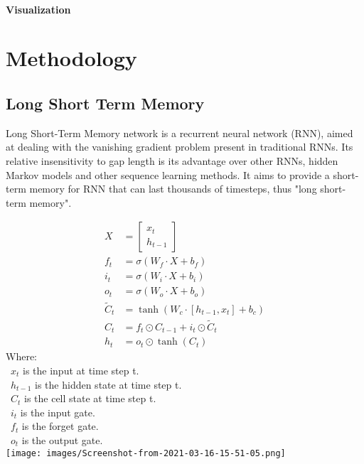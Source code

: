 \documentclass{ieeeojies}
\begin{document}
\paragraph{Visualization}
\section{Methodology}
\subsection{Long Short Term Memory}
Long Short-Term Memory network is a recurrent neural network (RNN), aimed at dealing with the vanishing gradient problem present in traditional RNNs. Its relative insensitivity to gap length is its advantage over other RNNs, hidden Markov models and other sequence learning methods. It aims to provide a short-term memory for RNN that can last thousands of timesteps, thus "long short-term memory".

\begin{align*}
X &= \begin{bmatrix}
    x_t \\
    h_{t-1}
\end{bmatrix} \\
f_t &= \sigma(W_f \cdot X + b_f) \\
i_t &= \sigma(W_i \cdot X + b_i) \\
o_t &= \sigma(W_o \cdot X + b_o) \\
\tilde{C}_t &= \tanh(W_c \cdot [h_{t-1}, x_t] + b_c) \\
C_t &= f_t \odot C_{t-1} + i_t \odot \tilde{C}_t \\
h_t &= o_t \odot \tanh(C_t)
\end{align*}
Where:\\
\indent \textbullet\ \(x_t\) is the input at time step t.\\
\indent \textbullet\ \(h_{t-1}\) is the hidden state at time step t.\\
\indent \textbullet\ \(C_t\) is the cell state at time step t.\\
\indent \textbullet\ \(i_t\) is the input gate.\\
\indent \textbullet\ \(f_t\) is the forget gate.\\
\indent \textbullet\ \(o_t\) is the output gate.\\
\texttt{[image: images/Screenshot-from-2021-03-16-15-51-05.png]}
\end{document}
